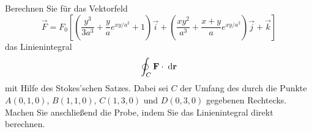 \begin{atiTask}[
  title = Verifikation des Satzes von Stokes
]
Berechnen Sie für das Vektorfeld
\[
\vec{F}=F_0\left[\left(\frac{y^3}{3a^3}+\frac{y}{a}e^{xy/a^2}+1\right)\vec{i}+\left(\frac{xy^2}{a^3}+\frac{x+y}{a}e^{xy/a^2}\right)\vec{j}+\vec{k}\right]
\]
das Linienintegral 
\[
\oint_C\mathbf{F}\cdot \;\mathrm{d} \mathbf{r}
\]
mit Hilfe des Stokes'schen Satzes. Dabei sei $C$ der Umfang des durch die Punkte $A(0,1,0)$, $B(1,1,0)$, $C(1,3,0)$ und $D(0,3,0)$ gegebenen Rechtecks. Machen Sie anschließend die Probe, indem Sie das Linienintegral direkt berechnen.
\end{atiTask}